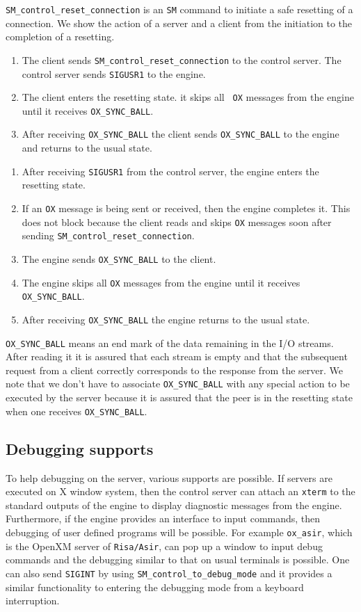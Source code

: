 {\tt SM\_control\_reset\_connection} is an {\tt SM} command to
initiate a safe resetting of a connection. We show the action of 
a server and a client from the initiation to the completion of
a resetting.

\centerline{}

\begin{enumerate}
\item The client sends {\tt SM\_control\_reset\_connection} to the
control server. The control server sends {\tt SIGUSR1} to the engine.
\item The client enters the resetting state. it skips all {\tt
OX} messages from the engine until it receives {\tt OX\_SYNC\_BALL}.
\item After receiving {\tt OX\_SYNC\_BALL} the client sends 
{\tt OX\_SYNC\_BALL} to the engine and returns to the usual state.
\end{enumerate}

\centerline{}

\begin{enumerate}
\item After receiving {\tt SIGUSR1} from the control server,
the engine enters the resetting state.
\item If an {\tt OX} message is being sent or received, then
the engine completes it. This does not block because
the client reads and skips {\tt OX} messages soon after sending
{\tt SM\_control\_reset\_connection}.
\item The engine sends {\tt OX\_SYNC\_BALL} to the client.
\item The engine skips all {\tt OX} messages from the engine until it
receives {\tt OX\_SYNC\_BALL}.
\item After receiving {\tt OX\_SYNC\_BALL} the engine returns to the
usual state.
\end{enumerate}

{\tt OX\_SYNC\_BALL} means an end mark of the data remaining in the
I/O streams. After reading it it is assured that each stream is empty
and that the subsequent request from a client correctly 
corresponds to the response from the server.
We note that we don't have to associate {\tt OX\_SYNC\_BALL} with
any special action to be executed by the server because it is
assured that the peer is in the resetting state when one receives
{\tt OX\_SYNC\_BALL}.

\subsection{Debugging supports}
To help debugging on the server, various supports are possible. If
servers are executed on X window system, then the control server can
attach an {\tt xterm} to the standard outputs of the engine to display
diagnostic messages from the engine.
Furthermore, if the engine provides an interface to input commands,
then debugging of user defined programs will be
possible. For example {\tt ox\_asir}, which is
the OpenXM server of {\tt Risa/Asir}, can pop up a window to input
debug commands and the debugging similar to that on usual terminals is possible.
One can also send {\tt SIGINT} by using {\tt SM\_control\_to\_debug\_mode}
and it provides a similar functionality to entering the debugging
mode from a keyboard interruption.
